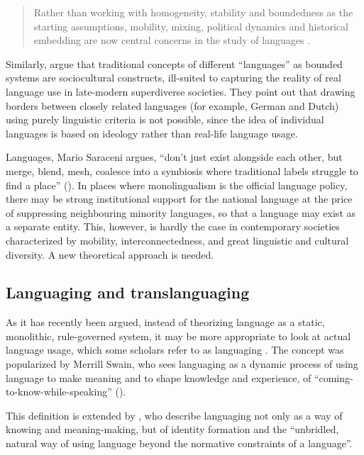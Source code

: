 \documentclass[output=paper]{langscibook}
\begin{document}
\begin{quote}
  Rather than working with homogeneity, stability and boundedness as the starting assumptions, mobility, mixing, political dynamics and historical embedding are now central concerns in the study of languages \citep[3]{Blommaert.2011}.

\end{quote}

\noindent
Similarly, \citet[27]{Jrgensen.2011} argue that traditional concepts of different ``languages'' as bounded systems are sociocultural constructs, ill-suited to capturing the reality of real language use in late-modern superdiverse societies. They point out that drawing borders between closely related languages (for example, German and Dutch) using purely linguistic criteria is not possible, since the idea of individual languages is based on ideology rather than real-life language usage.

Languages, Mario Saraceni argues, “don’t just exist alongside each other, but merge, blend, mesh, coalesce into a symbiosis where traditional labels struggle to find a place” (\citeyear[xi]{Saraceni.2015}). In places where monolingualism is the official language policy, there may be strong institutional support for the national language at the price of suppressing neighbouring minority languages, so that a language may exist as a separate entity. This, however, is hardly the case in contemporary societies characterized by mobility, interconnectedness, and great linguistic and cultural diversity. A new theoretical approach is needed.

\subsection{Languaging and translanguaging}
As it has recently been argued, instead of theorizing language as a static, monolithic, rule-governed system, it may be more appropriate to look at actual language usage, which some scholars refer to as languaging \citep{Swain.2006,Lankiewicz.2014}. The concept was popularized by Merrill Swain, who sees languaging as a dynamic process of using language to make meaning and to shape knowledge and experience, of “coming-to-know-while-speaking” (\citeyear[97]{Swain.2006}). 

This definition is extended by \citet[4]{Lankiewicz.2014}, who describe languaging not only as a way of knowing and meaning-making, but of identity formation and the “unbridled, natural way of using language beyond the normative constraints of a language”.
  
\end{document}
